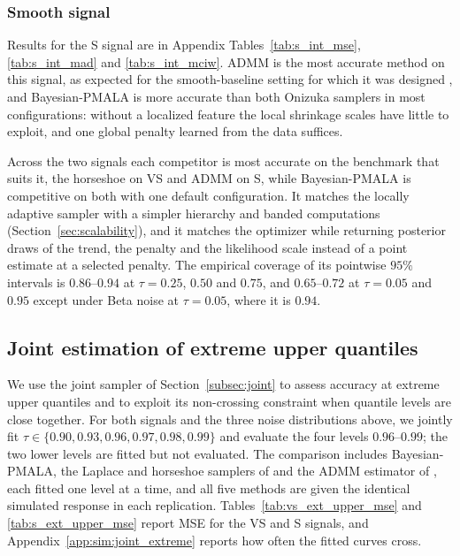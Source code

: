 \clearpage
\subsubsection{Smooth signal}
\label{sec:sim:ind:smooth}

Results for the S signal are in Appendix Tables~\ref{tab:s_int_mse}, \ref{tab:s_int_mad} and \ref{tab:s_int_mciw}. ADMM is the most accurate method on this signal, as expected for the smooth-baseline setting for which it was designed \citep{brantley2020baseline}, and Bayesian-PMALA is more accurate than both Onizuka samplers in most configurations: without a localized feature the local shrinkage scales have little to exploit, and one global penalty learned from the data suffices.

Across the two signals each competitor is most accurate on the benchmark that suits it, the horseshoe on VS and ADMM on S, while Bayesian-PMALA is competitive on both with one default configuration. It matches the locally adaptive sampler with a simpler hierarchy and banded computations (Section~\ref{sec:scalability}), and it matches the optimizer while returning posterior draws of the trend, the penalty and the likelihood scale instead of a point estimate at a selected penalty. The empirical coverage of its pointwise $95\%$ intervals is $0.86$--$0.94$ at $\tau=0.25$, $0.50$ and $0.75$, and $0.65$--$0.72$ at $\tau=0.05$ and $0.95$ except under Beta noise at $\tau=0.05$, where it is $0.94$.

\subsection{Joint estimation of extreme upper quantiles}
\label{sec:sim:extreme}

We use the joint sampler of Section~\ref{subsec:joint} to assess accuracy at extreme upper quantiles and to exploit its non-crossing constraint when quantile levels are close together. For both signals and the three noise distributions above, we jointly fit $\tau\in\{0.90,0.93,0.96,0.97,0.98,0.99\}$ and evaluate the four levels $0.96$--$0.99$; the two lower levels are fitted but not evaluated. The comparison includes Bayesian-PMALA, the Laplace and horseshoe samplers of \citet{onizuka2024fast} and the ADMM estimator of \citet{brantley2020baseline}, each fitted one level at a time, and all five methods are given the identical simulated response in each replication. Tables~\ref{tab:vs_ext_upper_mse} and \ref{tab:s_ext_upper_mse} report MSE for the VS and S signals, and Appendix~\ref{app:sim:joint_extreme} reports how often the fitted curves cross.

